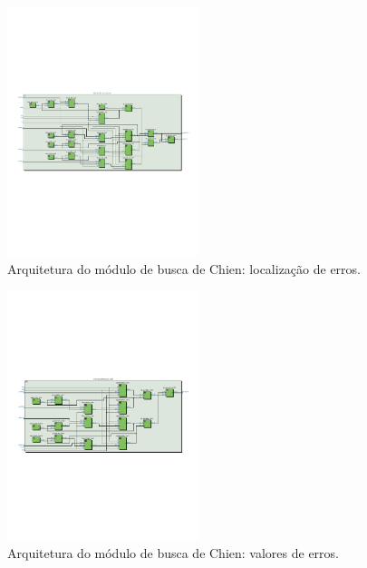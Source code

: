 \begin{figure}[h]
	\caption{\label{fig_chienloc_arq}Arquitetura do módulo de busca de Chien: localização de erros.}
	\centering
	\includegraphics[width=0.5\textwidth, trim={0 8cm 0 9cm}, clip]{RS/ChienLocationRTL.pdf}
\end{figure}

\begin{figure}[h]
	\caption{\label{fig_chienval_arq}Arquitetura do módulo de busca de Chien: valores de erros.}
	\centering
	\includegraphics[width=0.5\textwidth, trim={0 8cm 0 9cm}, clip]{RS/ChienValueRTL.pdf}
\end{figure}

